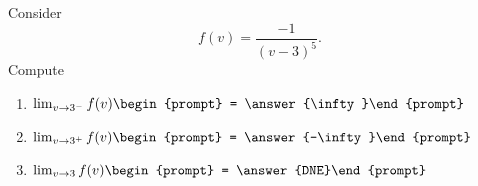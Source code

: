 \documentclass{ximera}
\author{Bart Snapp}
\begin{document}
\begin{exercise}
Consider 
\[
f(v) = \frac{-1}{(v-3)^5}.
\]
Compute
\begin{enumerate}
\item $\lim_{v\to 3^- } f(v) \begin{prompt} = \answer{\infty}\end{prompt}$
\item $\lim_{v\to 3^+ } f(v) \begin{prompt} = \answer{-\infty}\end{prompt}$
\item $\lim_{v\to 3 } f(v) \begin{prompt} = \answer{DNE}\end{prompt}$
\end{enumerate}
\end{exercise}
\end{document}
